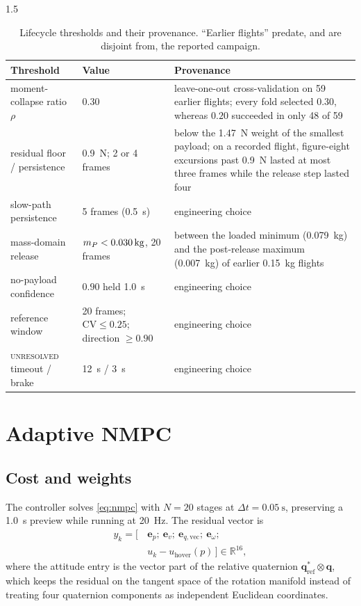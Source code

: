 \begin{spacing}{1.5}
\begin{table}[ht]
\centering
\caption{Lifecycle thresholds and their provenance. ``Earlier flights'' predate,
and are disjoint from, the reported campaign.}
\label{tab:thresholds}
\small
\begin{tabularx}{\textwidth}{@{}p{} p{} X@{}}
\toprule
\textbf{Threshold} & \textbf{Value} & \textbf{Provenance} \\
\midrule
moment-collapse ratio $\rho$ & $0.30$ &
leave-one-out cross-validation on 59 earlier flights; every fold selected
$0.30$, whereas $0.20$ succeeded in only 48 of 59 \\
residual floor / persistence & \SI{0.9}{\newton}; 2 or 4 frames &
below the \SI{1.47}{\newton} weight of the smallest payload; on a recorded
flight, figure-eight excursions past \SI{0.9}{\newton} lasted at most three
frames while the release step lasted four \\
slow-path persistence & 5 frames (\SI{0.5}{\second}) & engineering choice \\
mass-domain release & $\mP<\SI{0.030}{\kg}$, 20 frames &
between the loaded minimum (\SI{0.079}{\kg}) and the post-release maximum
(\SI{0.007}{\kg}) of earlier \SI{0.15}{\kg} flights \\
no-payload confidence & $0.90$ held \SI{1.0}{\second} & engineering choice \\
reference window & 20 frames; $\mathrm{CV}\le0.25$; direction $\ge0.90$ & engineering choice \\
\textsc{unresolved} timeout / brake & \SI{12}{\second} / \SI{3}{\second} & engineering choice \\
\bottomrule
\end{tabularx}
\end{table}

\section{Adaptive NMPC}\label{sec:frame:nmpc}

\subsection{Cost and weights}\label{sec:frame:nmpcweights}

The controller solves \eqref{eq:nmpc} with $N=20$ stages at
$\Delta t=\SI{0.05}{\second}$, preserving a \SI{1.0}{\second} preview while
running at \SI{20}{\hertz}. The residual vector is
\begin{equation}
\begin{aligned}
y_k = \bigl[\, &\bm e_p;\ \bm e_v;\ \bm e_{q,\mathrm{vec}};\ \bm e_\omega;\\
&u_k - u_{\mathrm{hover}}(p) \,\bigr] \in \mathbb{R}^{16},
\end{aligned}
\label{eq:nmpcresidual}
\end{equation}
where the attitude entry is the vector part of the relative quaternion
$\bm q_{\mathrm{ref}}^{*}\otimes\bm q$, which keeps the residual on the tangent
space of the rotation manifold instead of treating four quaternion components as
independent Euclidean coordinates.


\end{spacing}
